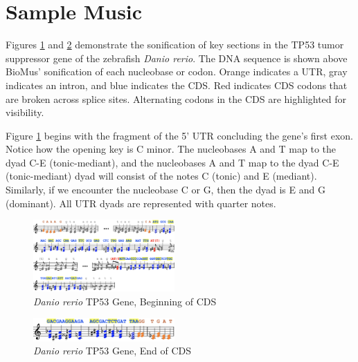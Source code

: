 \documentclass[letterpaper]{article}
\begin{document}
\section{Sample Music}

Figures \ref{fig:danio_rerio_start_translation} and \ref{fig:danio_rerio_end_translation} demonstrate the sonification of key sections in the TP53 tumor suppressor gene of the zebrafish \textit{Danio rerio}. The DNA sequence is shown above BioMus' sonification of each nucleobase or codon. Orange indicates a UTR, gray indicates an intron, and blue indicates the CDS. Red indicates CDS codons that are broken across splice sites. Alternating codons in the CDS are highlighted for visibility.

Figure \ref{fig:danio_rerio_start_translation} begins with the fragment of the 5' UTR concluding the gene's first exon. Notice how the opening key is C minor. The nucleobases A and T map to the dyad C-E\musFlat \; (tonic-mediant), and the nucleobases A and T map to the dyad C-E\musFlat \; (tonic-mediant) dyad will consist of the notes C (tonic) and E\musFlat \; (mediant). Similarly, if we encounter the nucleobase C or G, then the dyad is E\musFlat \; and G (dominant). All UTR dyads are represented with quarter notes.

\begin{figure}[h!]
\centering
\includegraphics[width=0.48\textwidth]{images/danio_rerio_start_translation}
\vspace{-3mm}
  \caption{\textit{Danio rerio} TP53 Gene, Beginning of CDS}
  \label{fig:danio_rerio_start_translation}
  \vspace{-3mm}
\end{figure}

\begin{figure}[h!]
\centering
\includegraphics[width=0.48\textwidth]{images/danio_rerio_end_translation}
\vspace{-3mm}
  \caption{\textit{Danio rerio} TP53 Gene, End of CDS}
  \label{fig:danio_rerio_end_translation}
  \vspace{-3mm}
\end{figure}
\end{document}

